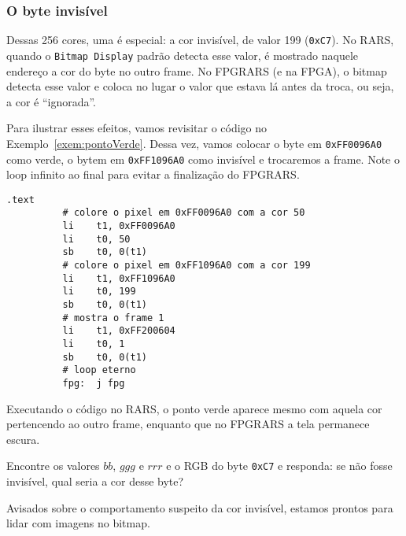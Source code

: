 \documentclass[10pt, a4paper, twoside]{article}
\begin{document}
    \subsubsection{O byte invisível}
      Dessas 256 cores, uma é especial: 
      a cor invisível, de valor 199 ({\tt 0xC7}).
      No RARS, quando o {\tt Bitmap Display} padrão detecta esse valor, é mostrado naquele endereço a cor do byte no outro frame.
      No FPGRARS (e na FPGA), o bitmap detecta esse valor e coloca no lugar o valor que estava lá antes da troca, ou seja, a cor é ``ignorada''. 
      \begin{exemplo}
        Para ilustrar esses efeitos, vamos revisitar o código no Exemplo~\ref{exem:pontoVerde}.
        Dessa vez, vamos colocar o byte em {\tt 0xFF0096A0} como verde, o bytem em {\tt 0xFF1096A0} como invisível e trocaremos a frame. 
        Note o loop infinito ao final para evitar a finalização do FPGRARS.
        \begin{lstlisting}[caption=Teste da cor invisível]
          .text
          # colore o pixel em 0xFF0096A0 com a cor 50
          li	t1, 0xFF0096A0
          li	t0, 50
          sb	t0, 0(t1)
          # colore o pixel em 0xFF1096A0 com a cor 199
          li	t1, 0xFF1096A0
          li	t0, 199
          sb	t0, 0(t1)
          # mostra o frame 1
          li	t1, 0xFF200604
          li	t0, 1
          sb	t0, 0(t1)
          # loop eterno
          fpg: 	j fpg
        \end{lstlisting}
        Executando o código no RARS, o ponto verde aparece mesmo com aquela cor pertencendo ao outro frame, enquanto que no FPGRARS a tela permanece escura.
      \end{exemplo}
      \begin{exercicio}
        Encontre os valores $bb$, $ggg$ e $rrr$ e o RGB do byte {\tt 0xC7} e responda: se não fosse invisível, qual seria a cor desse byte?
      \end{exercicio}
      Avisados sobre o comportamento suspeito da cor invisível, estamos prontos para lidar com imagens no bitmap. 
    
\end{document}
